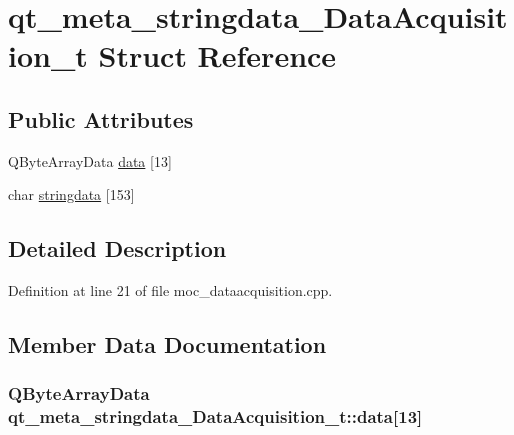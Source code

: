 \hypertarget{structqt__meta__stringdata___data_acquisition__t}{}\section{qt\+\_\+meta\+\_\+stringdata\+\_\+\+Data\+Acquisition\+\_\+t Struct Reference}
\label{structqt__meta__stringdata___data_acquisition__t}
\subsection*{Public Attributes}
\begin{DoxyCompactItemize}
\item 
Q\+Byte\+Array\+Data \hyperlink{structqt__meta__stringdata___data_acquisition__t_ac0105f0441e9d2e03490a15fc78d73c4}{data} \mbox{[}13\mbox{]}
\item 
char \hyperlink{structqt__meta__stringdata___data_acquisition__t_a1ba3bf5c97980ace5c219e418b22da1c}{stringdata} \mbox{[}153\mbox{]}
\end{DoxyCompactItemize}


\subsection{Detailed Description}


Definition at line 21 of file moc\+\_\+dataacquisition.\+cpp.



\subsection{Member Data Documentation}
\hypertarget{structqt__meta__stringdata___data_acquisition__t_ac0105f0441e9d2e03490a15fc78d73c4}{}
\subsubsection[{data}]{\setlength{\rightskip}{0pt plus 5cm}Q\+Byte\+Array\+Data qt\+\_\+meta\+\_\+stringdata\+\_\+\+Data\+Acquisition\+\_\+t\+::data\mbox{[}13\mbox{]}}\label{structqt__meta__stringdata___data_acquisition__t_ac0105f0441e9d2e03490a15fc78d73c4}


